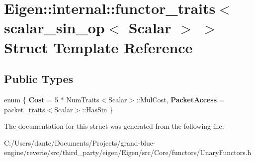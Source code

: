\hypertarget{struct_eigen_1_1internal_1_1functor__traits_3_01scalar__sin__op_3_01_scalar_01_4_01_4}{}\section{Eigen\+::internal\+::functor\+\_\+traits$<$ scalar\+\_\+sin\+\_\+op$<$ Scalar $>$ $>$ Struct Template Reference}
\label{struct_eigen_1_1internal_1_1functor__traits_3_01scalar__sin__op_3_01_scalar_01_4_01_4}
\subsection*{Public Types}
\begin{DoxyCompactItemize}
\item 
\mbox{\label{struct_eigen_1_1internal_1_1functor__traits_3_01scalar__sin__op_3_01_scalar_01_4_01_4_a3f9628197386ab93a6c0ac6d5c8b5c4a}} 
enum \{ {\bfseries Cost} = 5 $\ast$ Num\+Traits$<$Scalar$>$\+::Mul\+Cost, 
{\bfseries Packet\+Access} = packet\+\_\+traits$<$Scalar$>$\+::Has\+Sin
 \}
\end{DoxyCompactItemize}


The documentation for this struct was generated from the following file\+:\begin{DoxyCompactItemize}
\item 
C\+:/\+Users/dante/\+Documents/\+Projects/grand-\/blue-\/engine/reverie/src/third\+\_\+party/eigen/\+Eigen/src/\+Core/functors/Unary\+Functors.\+h\end{DoxyCompactItemize}
